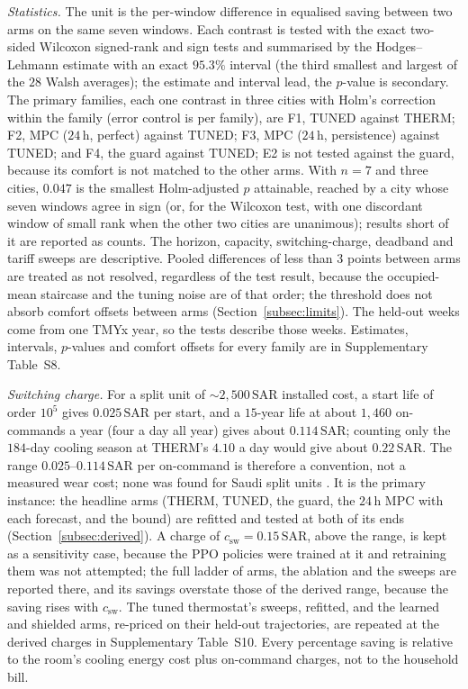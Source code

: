 \documentclass[pdflatex,sn-mathphys-num,iicol]{sn-jnl}
\theoremstyle{thmstyleone}\newtheorem{proposition}{Proposition}\newtheorem{corollary}{Corollary}
\theoremstyle{thmstyletwo}\newtheorem{remark}{Remark}\newtheorem{observation}{Observation}
\theoremstyle{thmstylethree}\newtheorem{definition}{Definition}
\newcommand{\csw}{c_{\mathrm{sw}}}
\newcommand{\SAR}{\text{SAR}}
\begin{document}
\emph{Statistics.} The unit is the per-window difference in equalised saving between two arms on the same seven windows. Each contrast is tested with the exact two-sided Wilcoxon signed-rank and sign tests and summarised by the Hodges--Lehmann estimate with an exact $95.3\%$ interval (the third smallest and largest of the $28$ Walsh averages); the estimate and interval lead, the $p$-value is secondary. The primary families, each one contrast in three cities with Holm's correction within the family (error control is per family), are F1, TUNED against THERM; F2, MPC ($24\,$h, perfect) against TUNED; F3, MPC ($24\,$h, persistence) against TUNED; and F4, the guard against TUNED; E2 is not tested against the guard, because its comfort is not matched to the other arms. With $n=7$ and three cities, $0.047$ is the smallest Holm-adjusted $p$ attainable, reached by a city whose seven windows agree in sign (or, for the Wilcoxon test, with one discordant window of small rank when the other two cities are unanimous); results short of it are reported as counts. The horizon, capacity, switching-charge, deadband and tariff sweeps are descriptive. Pooled differences of less than $3$ points between arms are treated as not resolved, regardless of the test result, because the occupied-mean staircase and the tuning noise are of that order; the threshold does not absorb comfort offsets between arms (Section~\ref{subsec:limits}). The held-out weeks come from one TMYx year, so the tests describe those weeks. Estimates, intervals, $p$-values and comfort offsets for every family are in Supplementary Table~S8.

\emph{Switching charge.} For a split unit of ${\sim}2{,}500\,\SAR$ installed cost, a start life of order $10^{5}$ gives $0.025\,\SAR$ per start, and a $15$-year life at about $1{,}460$ on-commands a year (four a day all year) gives about $0.114\,\SAR$; counting only the $184$-day cooling season at THERM's $4.10$ a day would give about $0.22\,\SAR$. The range $0.025$--$0.114\,\SAR$ per on-command is therefore a convention, not a measured wear cost; none was found for Saudi split units \citep{Pang2011}. It is the primary instance: the headline arms (THERM, TUNED, the guard, the $24\,$h MPC with each forecast, and the bound) are refitted and tested at both of its ends (Section~\ref{subsec:derived}). A charge of $\csw=0.15\,\SAR$, above the range, is kept as a sensitivity case, because the PPO policies were trained at it and retraining them was not attempted; the full ladder of arms, the ablation and the sweeps are reported there, and its savings overstate those of the derived range, because the saving rises with $\csw$. The tuned thermostat's sweeps, refitted, and the learned and shielded arms, re-priced on their held-out trajectories, are repeated at the derived charges in Supplementary Table~S10. Every percentage saving is relative to the room's cooling energy cost plus on-command charges, not to the household bill.
 
\end{document}
